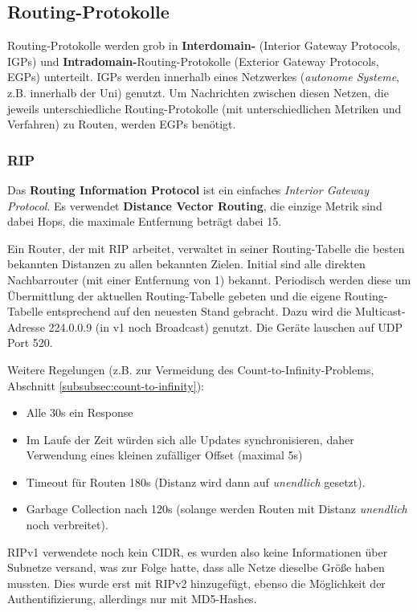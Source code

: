 \documentclass{article} %
\begin{document}
\subsection{Routing-Protokolle}
Routing-Protokolle werden grob in \textbf{Interdomain-} (Interior Gateway Protocols, IGPs) und \textbf{Intradomain-}Routing-Protokolle (Exterior Gateway Protocols, EGPs) unterteilt.
IGPs werden innerhalb eines Netzwerkes (\emph{autonome Systeme}, z.B. innerhalb der Uni) genutzt.
Um Nachrichten zwischen diesen Netzen, die jeweils unterschiedliche Routing-Protokolle (mit unterschiedlichen Metriken und Verfahren) zu Routen, werden EGPs benötigt.
\subsubsection{RIP}
Das \textbf{Routing Information Protocol} ist ein einfaches \emph{Interior Gateway Protocol}.
Es verwendet \textbf{Distance Vector Routing}, die einzige Metrik sind dabei Hops, die maximale Entfernung beträgt dabei 15.

Ein Router, der mit RIP arbeitet, verwaltet in seiner Routing-Tabelle die besten bekannten Distanzen zu allen bekannten Zielen.
Initial sind alle direkten Nachbarrouter (mit einer Entfernung von 1) bekannt.
Periodisch werden diese um Übermittlung der aktuellen Routing-Tabelle gebeten und die eigene Routing-Tabelle entsprechend auf den neuesten Stand gebracht.
Dazu wird die Multicast-Adresse 224.0.0.9 (in v1 noch Broadcast) genutzt.
Die Geräte lauschen auf UDP Port 520.

Weitere Regelungen (z.B. zur Vermeidung des Count-to-Infinity-Problems, Abschnitt \ref{subsubsec:count-to-infinity}):
\begin{itemize}
	\item Alle 30s ein Response
	\item Im Laufe der Zeit würden sich alle Updates synchronisieren, daher Verwendung eines kleinen zufälliger Offset (maximal 5s)
	\item Timeout für Routen 180s (Distanz wird dann auf \emph{unendlich} gesetzt).
	\item Garbage Collection nach 120s (solange werden Routen mit Distanz \emph{unendlich} noch verbreitet).
\end{itemize}
RIPv1 verwendete noch kein CIDR, es wurden also keine Informationen über Subnetze versand, was zur Folge hatte, dass alle Netze dieselbe Größe haben mussten.
Dies wurde erst mit RIPv2 hinzugefügt, ebenso die Möglichkeit der Authentifizierung, allerdings nur mit MD5-Hashes.
\end{document}
